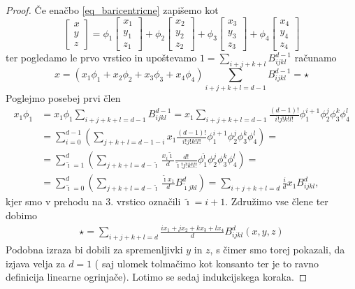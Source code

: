 \documentclass[11pt,a4paper]{article}
\begin{document}
\begin{proof}
    Če enačbo \eqref{eq_baricentricne} zapišemo kot 
    \begin{equation}
        \begin{bmatrix}
            x \\ y \\ z 
        \end{bmatrix} = 
        \phi_1\begin{bmatrix} x_1 \\ y_1 \\ z_1\end{bmatrix} +
        \phi_2\begin{bmatrix} x_2 \\ y_2 \\ z_2\end{bmatrix} +  
        \phi_3\begin{bmatrix} x_3 \\ y_3 \\ z_3\end{bmatrix} +
        \phi_4\begin{bmatrix} x_4 \\ y_4 \\ z_4\end{bmatrix}
    \end{equation}
    ter pogledamo le prvo vrstico in upoštevamo $1 = \sum_{i+j+k+l}B_{ijkl}^{d-1}$ računamo
    $$x = \left(x_1 \phi_1 + x_2 \phi_2 + x_3 \phi_3 +x_4 \phi_4 \right)  \sum_{i+j+k+l = d-1} B_{ijkl}^{d-1} = \star $$
    Poglejmo posebej prvi člen
    \begin{align*}
        x_1 \phi_1 &= x_1 \phi_1 \sum_{i+j+k+l = d-1} B_{ijkl}^{d-1} =  
            x_1  \sum_{i+j+k+l = d-1} \frac{(d-1)!}{i!j!k!l!} \phi_1^{i+1} \phi_2^j \phi_3^k \phi_4^l 
            \\ & = \sum_{i = 0}^{d-1} \left(\sum_{j+k+l = d-1-i} x_1 \frac{(d-1)!}{i!j!k!l!} \phi_1^{i+1} \phi_2^j \phi_3^k \phi_4^l \right) = 
            \\ & = \sum_{\tilde{\imath} = 1}^{d} \left(  \sum_{j+k+l = d-\tilde{\imath}} \frac{x_i \tilde{\imath}}{d} \frac{d!}{\tilde{\imath}! j!k!l!}     \phi_1^{\tilde{\imath}} \phi_2^j \phi_3^k \phi_4^l  \right) = 
            \\ & = \sum_{\tilde{\imath} = 0}^{d} \left( \sum_{j+k+l = d- \tilde{\imath}} \frac{\tilde{\imath} x_1}{d} B_{\tilde{\imath}jkl}^d\right) = 
            \sum_{i+j+k+l = d} \frac{i}{d} x_1 B_{ijkl}^d,
    \end{align*}
    kjer smo v prehodu na 3. vrstico označili $\tilde{\imath} = i+1$. Združimo vse člene ter 
    dobimo 
    \begin{align}
         \star
        = \sum_{i+j+k+l = d} \frac{ix_1 + jx_2 + k x_3 +l x_4}{d} B_{ijkl}^d(x,y,z)
    \end{align}
    Podobna izraza bi dobili 
    za spremenljivki $y$ in $z$, s čimer smo torej pokazali, 
    da izjava velja za $d = 1$ ( saj ulomek tolmačimo kot konsanto 
    ter je to ravno definicija linearne ogrinjače). Lotimo se sedaj indukcijskega koraka. 


\end{proof}
\end{document}
